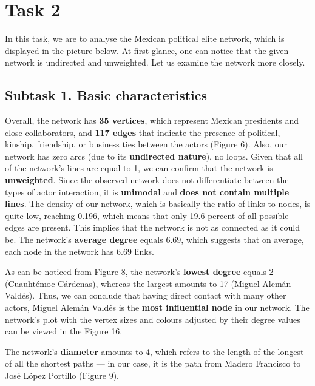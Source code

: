 \section{Task 2}
In this task, we are to analyse the Mexican political elite network, which is displayed in the picture below. At first glance, one can notice that the given network is undirected and unweighted. Let us examine the network more closely.



\subsection{Subtask 1. Basic characteristics}
Overall, the network has \textbf{35 vertices}, which represent Mexican presidents and close collaborators, and \textbf{117 edges} that indicate the presence of political, kinship, friendship, or business ties between the actors (Figure 6). Also, our network has zero arcs (due to its \textbf{undirected nature}), no loops. Given that all of the network’s lines are equal to 1, we can confirm that the network is \textbf{unweighted}. Since the observed network does not differentiate between the types of actor interaction, it is \textbf{unimodal} and \textbf{does not contain multiple lines}. The density of our network, which is basically the ratio of links to nodes, is quite low, reaching 0.196, which means that only 19.6 percent of all possible edges are present. This implies that the network is not as connected as it could be. The network’s \textbf{average degree} equals 6.69, which suggests that on average, each node in the network has 6.69 links.

\FloatBarrier


As can be noticed from Figure 8, the network’s \textbf{lowest degree} equals 2 (Cuauhtémoc Cárdenas), whereas the largest amounts to 17 (Miguel Alemán Valdés). Thus, we can conclude that having direct contact with many other actors, Miguel Alemán Valdés is the \textbf{most influential node} in our network. The network’s plot with the vertex sizes and colours adjusted by their degree values can be viewed in the Figure 16.


The network’s \textbf{diameter} amounts to 4, which refers to the length of the longest of all the shortest paths — in our case, it is the path from Madero Francisco to José López Portillo (Figure 9).

